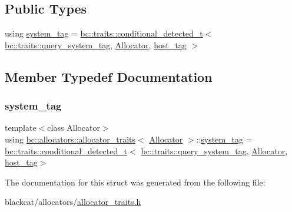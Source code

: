 \subsection*{Public Types}
\begin{DoxyCompactItemize}
\item 
using \hyperlink{structbc_1_1allocators_1_1allocator__traits_a527cf77071c45a9dcc2c8213f65f37b3}{system\+\_\+tag} = \hyperlink{namespacebc_1_1traits_a1a6d378947ec32acd457890854bcd592}{bc\+::traits\+::conditional\+\_\+detected\+\_\+t}$<$ \hyperlink{namespacebc_1_1traits_acfa34d40f06d5122586d7adefdfeb42f}{bc\+::traits\+::query\+\_\+system\+\_\+tag}, \hyperlink{classbc_1_1allocators_1_1Allocator}{Allocator}, \hyperlink{structbc_1_1host__tag}{host\+\_\+tag} $>$
\end{DoxyCompactItemize}


\subsection{Member Typedef Documentation}
\mbox{\label{structbc_1_1allocators_1_1allocator__traits_a527cf77071c45a9dcc2c8213f65f37b3}} 
\subsubsection{\texorpdfstring{system\+\_\+tag}{system\_tag}}
{\footnotesize\ttfamily template$<$class Allocator$>$ \\
using \hyperlink{structbc_1_1allocators_1_1allocator__traits}{bc\+::allocators\+::allocator\+\_\+traits}$<$ \hyperlink{classbc_1_1allocators_1_1Allocator}{Allocator} $>$\+::\hyperlink{structbc_1_1allocators_1_1allocator__traits_a527cf77071c45a9dcc2c8213f65f37b3}{system\+\_\+tag} =  \hyperlink{namespacebc_1_1traits_a1a6d378947ec32acd457890854bcd592}{bc\+::traits\+::conditional\+\_\+detected\+\_\+t}$<$ \hyperlink{namespacebc_1_1traits_acfa34d40f06d5122586d7adefdfeb42f}{bc\+::traits\+::query\+\_\+system\+\_\+tag}, \hyperlink{classbc_1_1allocators_1_1Allocator}{Allocator}, \hyperlink{structbc_1_1host__tag}{host\+\_\+tag}$>$}



The documentation for this struct was generated from the following file\+:\begin{DoxyCompactItemize}
\item 
blackcat/allocators/\hyperlink{allocator__traits_8h}{allocator\+\_\+traits.\+h}\end{DoxyCompactItemize}
